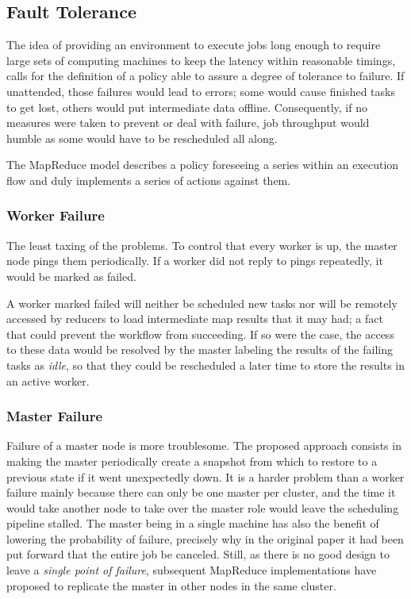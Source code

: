 \subsection{Fault Tolerance}\label{subsec:toleranciafallos}

\noindent The idea of providing an environment to execute jobs long enough to require large sets of computing machines to keep the latency within reasonable timings, calls for the definition of a policy able to assure a degree of tolerance to failure. If unattended, those failures would lead to errors; some would cause finished tasks to get lost, others would put intermediate data offline. Consequently, if no measures were taken to prevent or deal with failure, job throughput would humble as some would have to be rescheduled all along.

The MapReduce model describes a policy foreseeing a series within an execution flow and duly implements a series of actions against them.

\subsubsection{Worker Failure}\label{subsubsec:fallotrabajador}

\noindent The least taxing of the problems. To control that every worker is up, the master node pings them periodically. If a worker did not reply to pings repeatedly, it would be marked as failed.

A worker marked failed will neither be scheduled new tasks nor will be remotely accessed by reducers to load intermediate map results that it may had; a fact that could prevent the workflow from succeeding. If so were the case, the access to these data would be resolved by the master labeling the results of the failing tasks as \emph{idle}, so that they could be rescheduled a later time to store the results in an active worker.

\subsubsection{Master Failure}\label{subsubsec:fallomaestro}

Failure of a master node is more troublesome. The proposed approach consists in making the master periodically create a snapshot from which to restore to a previous state if it went unexpectedly down. It is a harder problem than a worker failure mainly because there can only be one master per cluster, and the time it would take another node to take over the master role would leave the scheduling pipeline stalled. The master being in a single machine has also the benefit of lowering the probability of failure, precisely why in the original paper \cite{googlemapreduce} it had been put forward that the entire job be canceled. Still, as there is no good design to leave a \emph{single point of failure}, subsequent MapReduce implementations have proposed to replicate the master in other nodes in the same cluster.

